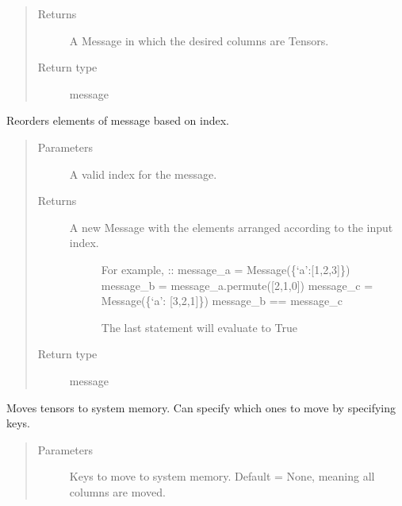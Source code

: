 \documentclass[letterpaper,10pt,english]{sphinxmanual}
\begin{document}
\begin{fulllineitems}
\begin{fulllineitems}
\begin{quote}
\begin{description}
\item[{Returns}] \leavevmode
A Message in which the desired columns are Tensors.

\item[{Return type}] \leavevmode
message

\end{description}\end{quote}

\end{fulllineitems}


\begin{fulllineitems}
\label{\detokenize{Fireworks:Fireworks.core.message.Message.permute}}
Reorders elements of message based on index.
\begin{quote}\begin{description}
\item[{Parameters}] \leavevmode
{} \textendash{} A valid index for the message.

\item[{Returns}] \leavevmode
\begin{description}
\item[{A new Message with the elements arranged according to the input index.}] \leavevmode
For example,
::
message\_a = Message(\{‘a’:{[}1,2,3{]}\})
message\_b = message\_a.permute({[}2,1,0{]})
message\_c = Message(\{‘a’: {[}3,2,1{]}\})
message\_b == message\_c

The last statement will evaluate to True

\end{description}


\item[{Return type}] \leavevmode
message

\end{description}\end{quote}

\end{fulllineitems}


\begin{fulllineitems}
\label{\detokenize{Fireworks:Fireworks.core.message.Message.cpu}}
Moves tensors to system memory. Can specify which ones to move by specifying keys.
\begin{quote}\begin{description}
\item[{Parameters}] \leavevmode
{} \textendash{} Keys to move to system memory. Default = None, meaning all columns are moved.


\end{description}
\end{quote}
\end{fulllineitems}
\end{fulllineitems}
\end{document}
